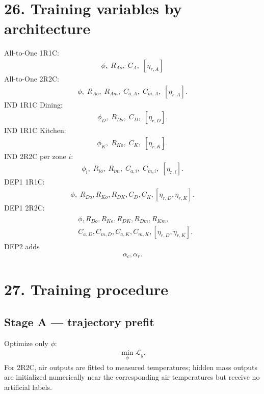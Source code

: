 \documentclass[11pt]{article}
\begin{document}
\section*{26. Training variables by architecture}
All-to-One 1R1C:
\begin{align}
\boxed{\phi,\;R_{Ao},\;C_A,\;[\eta_{r,A}]}
\tag{P2.110}
\end{align}
All-to-One 2R2C:
\begin{align}
\boxed{\phi,\;R_{Ao},\;R_{Am},\;C_{a,A},\;C_{m,A},\;[\eta_{r,A}].}
\tag{P2.111}
\end{align}
IND 1R1C Dining:
\begin{align}
\boxed{\phi_D,\;R_{Do},\;C_D,\;[\eta_{r,D}].}
\tag{P2.112}
\end{align}
IND 1R1C Kitchen:
\begin{align}
\boxed{\phi_K,\;R_{Ko},\;C_K,\;[\eta_{r,K}].}
\tag{P2.113}
\end{align}
IND 2R2C per zone \(i\):
\begin{align}
\boxed{\phi_i,\;R_{io},\;R_{im},\;C_{a,i},\;C_{m,i},\;[\eta_{r,i}].}
\tag{P2.114}
\end{align}
DEP1 1R1C:
\begin{align}
\boxed{\phi,\;R_{Do},R_{Ko},R_{DK},C_D,C_K,[\eta_{r,D},\eta_{r,K}].}
\tag{P2.115}
\end{align}
DEP1 2R2C:
\begin{align}
\boxed{\begin{aligned}
&\phi,R_{Do},R_{Ko},R_{DK},R_{Dm},R_{Km},\\
&C_{a,D},C_{m,D},C_{a,K},C_{m,K},[\eta_{r,D},\eta_{r,K}].
\end{aligned}}
\tag{P2.116}
\end{align}
DEP2 adds
\begin{align}
\boxed{\alpha_c,\alpha_r.}
\tag{P2.117}
\end{align}

\section*{27. Training procedure}
\subsection*{Stage A --- trajectory prefit}
Optimize only \(\phi\):
\begin{align}
\boxed{\min_\phi\mathcal L_y.}
\tag{P2.118}
\end{align}
For 2R2C, air outputs are fitted to measured temperatures; hidden mass outputs are initialized numerically near the corresponding air temperatures but receive no artificial labels.
\end{document}

